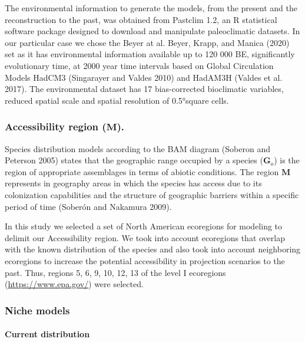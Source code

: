 \documentclass[
]{article}
\begin{document}
The environmental information to generate the models, from the present
and the reconstruction to the past, was obtained from Pastclim 1.2, an R
statistical software package designed to download and manipulate
paleoclimatic datasets. In our particular case we chose the Beyer at al.
Beyer, Krapp, and Manica (2020) set as it has environmental information
available up to 120 000 BE, significantly evolutionary time, at 2000
year time intervals based on Global Circulation Models HadCM3
(Singarayer and Valdes 2010) and HadAM3H (Valdes et al. 2017). The
environmental dataset has 17 bias-corrected bioclimatic variables,
reduced spatial scale and spatial resolution of 0.5°square cells.

\hypertarget{accessibility-region-textbfm.}{%
\subsubsection{\texorpdfstring{Accessibility region
(\(\textbf{M}\)).}{Accessibility region (\textbackslash textbf\{M\}).}}\label{accessibility-region-textbfm.}}

Species distribution models according to the BAM diagram (Soberon and
Peterson 2005) states that the geographic range occupied by a species
(\(\textbf{G}_o\)) is the region of appropriate assemblages in terms of
abiotic conditions. The region \(\textbf{M}\) represents in geography
areas in which the species has access due to its colonization
capabilities and the structure of geographic barriers within a specific
period of time (Soberón and Nakamura 2009).

In this study we selected a set of North American ecoregions for
modeling to delimit our Accessibility region. We took into account
ecoregions that overlap with the known distribution of the species and
also took into account neighboring ecoregions to increase the potential
accessibility in projection scenarios to the past. Thus, regions 5, 6,
9, 10, 12, 13 of the level I ecoregions (\url{https://www.epa.gov/})
were selected.

\hypertarget{niche-models}{%
\subsubsection{Niche models}\label{niche-models}}

\hypertarget{current-distribution}{%
\paragraph{Current distribution}\label{current-distribution}}
\end{document}
